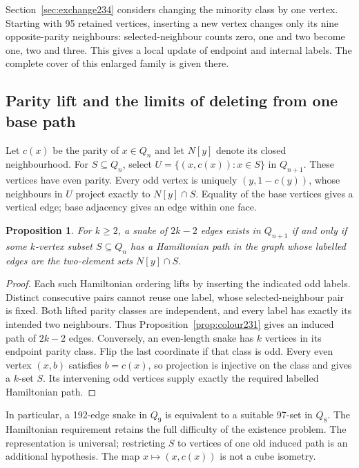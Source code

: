 \documentclass[11pt,a4paper]{article}
\newtheorem{proposition}[theorem]{Proposition}
\theoremstyle{definition}
\theoremstyle{remark}
\begin{document}
Section~\ref{sec:exchange234} considers changing the minority class by
one vertex. Starting
with 95 retained vertices, inserting a new vertex changes only its nine
opposite-parity neighbours: selected-neighbour counts zero, one and two
become one, two and three. This gives a local update of endpoint and
internal labels. The complete cover of this enlarged family is given there.

\subsection{Parity lift and the limits of deleting from one base path}
\label{sec:parity233}
Let $c(x)$ be the parity of $x\in Q_n$ and let $N[y]$ denote its closed
neighbourhood. For $S\subseteq Q_n$, select
$U=\{(x,c(x)):x\in S\}$ in $Q_{n+1}$. These vertices have even parity.
Every odd vertex is uniquely $(y,1-c(y))$, whose neighbours in $U$
project exactly to $N[y]\cap S$. Equality of the base vertices gives
a vertical edge; base adjacency gives an edge within one face.

\begin{proposition}\label{prop:projection233}
For $k\ge2$, a snake of $2k-2$ edges exists in $Q_{n+1}$ if and only if
some $k$-vertex subset $S\subseteq Q_n$ has a Hamiltonian path in the
graph whose labelled edges are the two-element sets $N[y]\cap S$.
\end{proposition}
\begin{proof}
Each such Hamiltonian ordering lifts by inserting the indicated odd
labels. Distinct consecutive pairs cannot reuse one label, whose
selected-neighbour pair is fixed. Both lifted parity classes are
independent, and every label has exactly its intended two neighbours.
Thus Proposition~\ref{prop:colour231} gives an induced path of $2k-2$
edges. Conversely, an even-length snake has $k$ vertices in its endpoint
parity class. Flip the last coordinate if that class is odd. Every even
vertex $(x,b)$ satisfies $b=c(x)$, so projection is injective on the
class and gives a $k$-set $S$. Its intervening odd vertices supply exactly
the required labelled Hamiltonian path.
\end{proof}

In particular, a 192-edge snake in $Q_9$ is equivalent to a suitable
97-set in $Q_8$. The Hamiltonian requirement retains the full difficulty
of the existence problem. The representation is universal; restricting
$S$ to vertices of one old induced path is an additional hypothesis.
The map $x\mapsto(x,c(x))$ is not a cube isometry.
\end{document}
